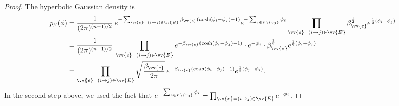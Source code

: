 \documentclass[a4paper, 11pt]{article}
\begin{document}
\begin{proof}
The hyperbolic Gaussian density is
\begin{equation*}
\begin{aligned}
    p_\beta(\phi)
    &= \frac{1}{(2\pi)^{(n-1)/2}}\,e^{-\sum_{\vv{e}=(i\to j)\in \vv{E}}\beta_{\vv{e}}(\cosh(\phi_i-\phi_j)-1)}e^{-\sum_{i\in V\backslash\{v_0\} }\phi_i} \prod_{\vv{e}=(i\to j)\in \vv{E}}\beta_{\vv{e}}^{\frac{1}{2}} e^{\frac{1}{2}(\phi_i+\phi_j)}\\
    &= \frac{1}{(2\pi)^{(n-1)/2}}\,\prod_{\vv{e}=(i\to j)\in \vv{E}}e^{-\beta_{\vv{e}}(\cosh(\phi_i-\phi_j)-1)}\cdot e^{-\phi_i}\cdot \beta_{\vv{e}}^{\frac{1}{2}} e^{\frac{1}{2}(\phi_i+\phi_j)}\\
    &= \prod_{\vv{e}=(i\to j)\in \vv{E}}\sqrt{\frac{\beta_{\vv{e}}}{2\pi}} \,e^{-\beta_{\vv{e}}(\cosh(\phi_i-\phi_j)-1)} e^{\frac{1}{2}(\phi_j-\phi_i)}.
\end{aligned}
\end{equation*}
In the second step above, we used the fact that $e^{-\sum_{i\in V\backslash\{v_0\} }\phi_i}=\prod_{\vv{e}=(i\to j)\in \vv{E}} e^{-\phi_i}$.



\end{proof}
\end{document}
